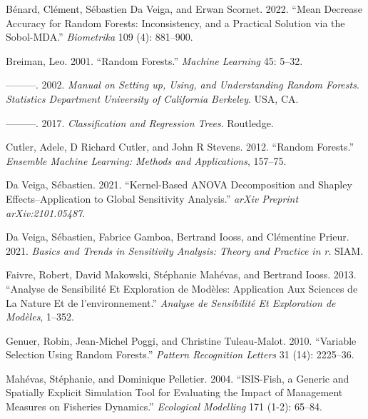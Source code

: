\documentclass[
]{article}
\newlength{\cslhangindent}
\newlength{\cslentryspacingunit} %
\newenvironment{CSLReferences}[2] %
 {%
  \setlength{\parindent}{0pt}
  \ifodd #1
  \let\oldpar\par
  \def\par{\hangindent=\cslhangindent\oldpar}
  \fi
  \setlength{\parskip}{#2\cslentryspacingunit}
 }%
 {}
\begin{document}
\hypertarget{refs}{}
\begin{CSLReferences}{1}{0}
\leavevmode{}%
Bénard, Clément, Sébastien Da Veiga, and Erwan Scornet. 2022. {``Mean
Decrease Accuracy for Random Forests: Inconsistency, and a Practical
Solution via the Sobol-MDA.''} \emph{Biometrika} 109 (4): 881--900.

\leavevmode{}%
Breiman, Leo. 2001. {``Random Forests.''} \emph{Machine Learning} 45:
5--32.

\leavevmode{}%
---------. 2002. \emph{Manual on Setting up, Using, and Understanding
Random Forests}. \emph{Statistics Department University of California
Berkeley}. USA, CA.

\leavevmode{}%
---------. 2017. \emph{Classification and Regression Trees}. Routledge.

\leavevmode{}%
Cutler, Adele, D Richard Cutler, and John R Stevens. 2012. {``Random
Forests.''} \emph{Ensemble Machine Learning: Methods and Applications},
157--75.

\leavevmode{}%
Da Veiga, Sébastien. 2021. {``Kernel-Based ANOVA Decomposition and
Shapley Effects--Application to Global Sensitivity Analysis.''}
\emph{arXiv Preprint arXiv:2101.05487}.

\leavevmode{}%
Da Veiga, Sébastien, Fabrice Gamboa, Bertrand Iooss, and Clémentine
Prieur. 2021. \emph{Basics and Trends in Sensitivity Analysis: Theory
and Practice in r}. SIAM.

\leavevmode{}%
Faivre, Robert, David Makowski, Stéphanie Mahévas, and Bertrand Iooss.
2013. {``Analyse de Sensibilit{é} Et Exploration de Mod{è}les:
Application Aux Sciences de La Nature Et de l'environnement.''}
\emph{Analyse de Sensibilit{é} Et Exploration de Mod{è}les}, 1--352.

\leavevmode{}%
Genuer, Robin, Jean-Michel Poggi, and Christine Tuleau-Malot. 2010.
{``Variable Selection Using Random Forests.''} \emph{Pattern Recognition
Letters} 31 (14): 2225--36.

\leavevmode{}%
Mahévas, Stéphanie, and Dominique Pelletier. 2004. {``ISIS-Fish, a
Generic and Spatially Explicit Simulation Tool for Evaluating the Impact
of Management Measures on Fisheries Dynamics.''} \emph{Ecological
Modelling} 171 (1-2): 65--84.


\end{CSLReferences}
\end{document}
